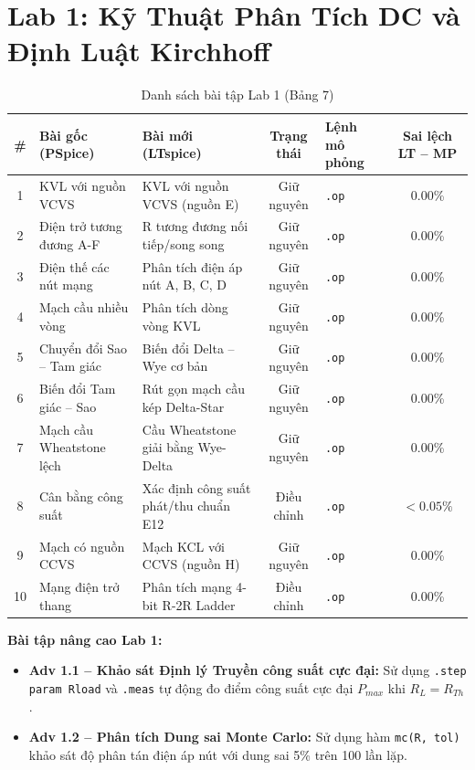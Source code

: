 \documentclass[12pt,a4paper]{report}
\begin{document}
\section{Lab 1: Kỹ Thuật Phân Tích DC và Định Luật Kirchhoff}

\begin{table}[H]
\centering
\caption{Danh sách bài tập Lab 1 (Bảng 7)}
\label{tab:bang7_lab1}
\renewcommand{\arraystretch}{1.2}
\small
\begin{tabularx}{\textwidth}{|c|p{4.0cm}|p{4.0cm}|c|l|c|}
\hline
\rowcolor{codebg}
\textbf{\#} & \textbf{Bài gốc (PSpice)} & \textbf{Bài mới (LTspice)} & \textbf{Trạng thái} & \textbf{Lệnh mô phỏng} & \textbf{Sai lệch LT -- MP} \\ \hline
1 & KVL với nguồn VCVS & KVL với nguồn VCVS (nguồn E) & Giữ nguyên & \lstinline|.op| & 0.00\% \\ \hline
2 & Điện trở tương đương A-F & R tương đương nối tiếp/song song & Giữ nguyên & \lstinline|.op| & 0.00\% \\ \hline
3 & Điện thế các nút mạng & Phân tích điện áp nút A, B, C, D & Giữ nguyên & \lstinline|.op| & 0.00\% \\ \hline
4 & Mạch cầu nhiều vòng & Phân tích dòng vòng KVL & Giữ nguyên & \lstinline|.op| & 0.00\% \\ \hline
5 & Chuyển đổi Sao -- Tam giác & Biến đổi Delta -- Wye cơ bản & Giữ nguyên & \lstinline|.op| & 0.00\% \\ \hline
6 & Biến đổi Tam giác -- Sao & Rút gọn mạch cầu kép Delta-Star & Giữ nguyên & \lstinline|.op| & 0.00\% \\ \hline
7 & Mạch cầu Wheatstone lệch & Cầu Wheatstone giải bằng Wye-Delta & Giữ nguyên & \lstinline|.op| & 0.00\% \\ \hline
8 & Cân bằng công suất & Xác định công suất phát/thu chuẩn E12 & Điều chỉnh & \lstinline|.op| & $<0.05\%$ \\ \hline
9 & Mạch có nguồn CCVS & Mạch KCL với CCVS (nguồn H) & Giữ nguyên & \lstinline|.op| & 0.00\% \\ \hline
10 & Mạng điện trở thang & Phân tích mạng 4-bit R-2R Ladder & Điều chỉnh & \lstinline|.op| & 0.00\% \\ \hline
\end{tabularx}
\end{table}

\textbf{Bài tập nâng cao Lab 1:}
\begin{itemize}[noitemsep]
    \item \textbf{Adv 1.1 -- Khảo sát Định lý Truyền công suất cực đại:} Sử dụng \lstinline|.step param Rload| và \lstinline|.meas| tự động đo điểm công suất cực đại $P_{max}$ khi $R_L = R_{Th}$.
    \item \textbf{Adv 1.2 -- Phân tích Dung sai Monte Carlo:} Sử dụng hàm \lstinline|mc(R, tol)| khảo sát độ phân tán điện áp nút với dung sai 5\% trên 100 lần lặp.
\end{itemize}
\end{document}
